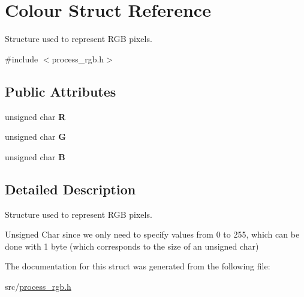 \hypertarget{structColour}{}\section{Colour Struct Reference}
\label{structColour}


Structure used to represent R\+GB pixels.  




{\ttfamily \#include $<$process\+\_\+rgb.\+h$>$}

\subsection*{Public Attributes}
\begin{DoxyCompactItemize}
\item 
\mbox{\label{structColour_ade4914e40854a95c279b1bee14984fc9}} 
unsigned char {\bfseries R}
\item 
\mbox{\label{structColour_aa198bc59f7371a0a811a22cafa558d11}} 
unsigned char {\bfseries G}
\item 
\mbox{\label{structColour_aaff1e0d1cd30296696a75739210e6e15}} 
unsigned char {\bfseries B}
\end{DoxyCompactItemize}


\subsection{Detailed Description}
Structure used to represent R\+GB pixels. 

Unsigned Char since we only need to specify values from 0 to 255, which can be done with 1 byte (which corresponds to the size of an unsigned char) 

The documentation for this struct was generated from the following file\+:\begin{DoxyCompactItemize}
\item 
src/\hyperlink{process__rgb_8h}{process\+\_\+rgb.\+h}\end{DoxyCompactItemize}
